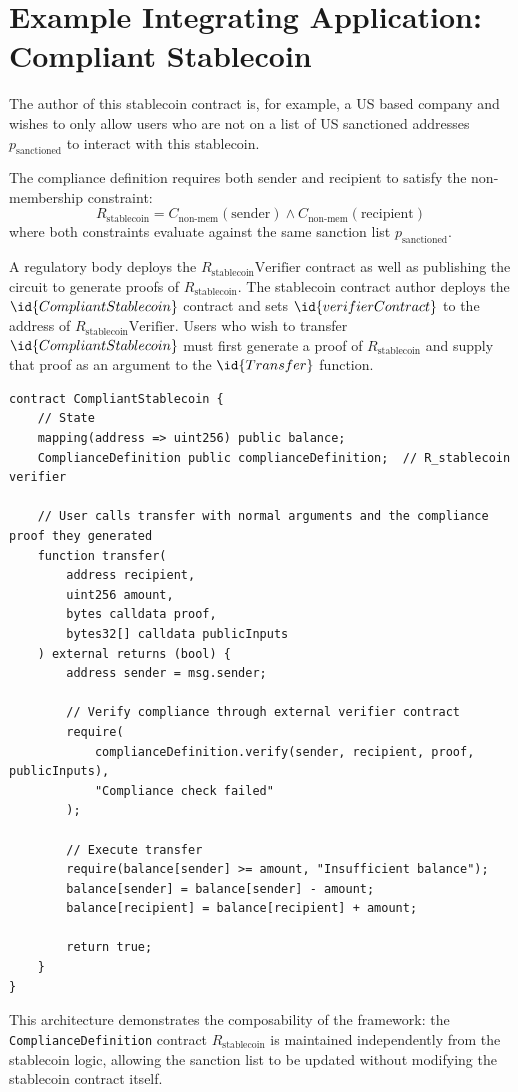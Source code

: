 \documentclass[9pt]{extreport}
\begin{document}
\section{Example Integrating Application: Compliant Stablecoin}
The author of this stablecoin contract is, for example, a US based company and wishes to only allow users who are not on a list of US sanctioned addresses $p_{\text{sanctioned}}$ to interact with this stablecoin. 

The compliance definition requires both sender and recipient to satisfy the non-membership constraint:
$$R_{\text{stablecoin}} = C_{\text{non-mem}}(\text{sender}) \land C_{\text{non-mem}}(\text{recipient})$$
where both constraints evaluate against the same sanction list $p_{\text{sanctioned}}$.

A regulatory body deploys the $R_{\text{stablecoin}}\text{Verifier}$ contract as well as publishing the circuit to generate proofs of $R_{\text{stablecoin}}$.  The stablecoin contract author deploys the \\$\id{CompliantStablecoin}$ contract and sets $\id{verifierContract}$ to the address of $R_{\text{stablecoin}}\text{Verifier}$.  Users who wish to transfer $\id{CompliantStablecoin}$ must first generate a proof of $R_{\text{stablecoin}}$ and supply that proof as an argument to the $\id{Transfer}$ function.
\newpage
\begin{singlespace}
\begin{lstlisting}[language=Solidity]
contract CompliantStablecoin {
    // State
    mapping(address => uint256) public balance;
    ComplianceDefinition public complianceDefinition;  // R_stablecoin verifier

    // User calls transfer with normal arguments and the compliance proof they generated
    function transfer(
        address recipient,
        uint256 amount,
        bytes calldata proof,
        bytes32[] calldata publicInputs
    ) external returns (bool) {
        address sender = msg.sender;

        // Verify compliance through external verifier contract
        require(
            complianceDefinition.verify(sender, recipient, proof, publicInputs),
            "Compliance check failed"
        );

        // Execute transfer
        require(balance[sender] >= amount, "Insufficient balance");
        balance[sender] = balance[sender] - amount;
        balance[recipient] = balance[recipient] + amount;

        return true;
    }
}
\end{lstlisting}
\end{singlespace}
\noindent
This architecture demonstrates the composability of the framework: the \texttt{ComplianceDefinition} contract $R_{\text{stablecoin}}$ is maintained independently from the stablecoin logic, allowing the sanction list to be updated without modifying the stablecoin contract itself.
\end{document}
